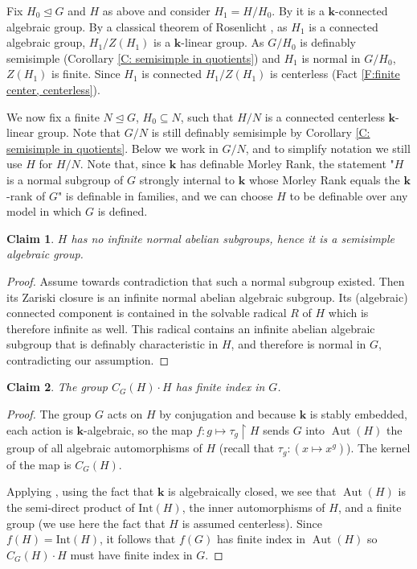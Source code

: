 \documentclass[11pt]{amsart}
\DeclareMathOperator{\aut}{Aut} \DeclareMathOperator{\id}{Id}
\newtheorem{claim}{Claim}[theorem]
\theoremstyle{definition}
\newcommand{\bk}{\textbf{k}}
\newcommand{\0}{\emptyset}
\def\sub{\subseteq}
\begin{document}
Fix $H_0\trianglelefteq G$ and $H$ as above and consider $H_1=H/H_0$. By \cite[Theorem 1]{BousHrWeil} it is a $\bk$-connected algebraic group.  
By a classical theorem of Rosenlicht \cite[Theorem 13]{rosenlicht}, as  $H_1$ is a connected algebraic group,   $H_1/Z(H_1)$ is a $\bk$-linear group. As $G/H_0$ is definably semisimple (Corollary \ref{C: semisimple in quotients})
 and $H_1$ is normal in $G/H_0$, $Z(H_1)$ is finite.  Since $H_1$ is  connected $H_1/Z(H_1)$ is centerless (Fact \ref{F:finite center, centerless}).

We now fix a finite $N\trianglelefteq G$, $H_0\sub N$,  such that 
$H/N$ is a connected centerless $\bk$-linear group. Note that $G/N$ is still definably semisimple by Corollary \ref{C: semisimple in quotients}. Below we work in $G/N$, and to simplify notation we still use $H$ for $H/N$. Note that, since $\bk$ has definable Morley Rank, the statement "$H$ is a normal subgroup of $G$ strongly internal to $\bk$ whose Morley Rank equals the $\bk$-rank of $G$" is definable in families, and we can choose $H$ to be definable over any model in which $G$ is defined. 

\begin{claim}
    $H$ has no infinite normal abelian subgroups, hence it is a semisimple algebraic group.
\end{claim}
\begin{proof} Assume towards contradiction that such a normal subgroup existed. Then its Zariski closure is an infinite normal abelian  algebraic subgroup. Its (algebraic) connected component 
is contained in the solvable radical $R$ of $H$ which is therefore infinite as well. This radical contains an infinite abelian algebraic subgroup that is definably characteristic in $H$, and therefore is normal in $G$, contradicting our assumption. 
\end{proof}

\begin{claim} 
The group $C_G(H)\cdot H$ has finite index in $G$.
\end{claim} 
\begin{proof}
The group $G$ acts on $H$ by conjugation and because $\bk$ is stably embedded, each action is $\bk$-algebraic, so the map $f:g\mapsto \tau_g\restriction H$ sends $G$ into $\aut(H)$ the group of all algebraic automorphisms of $H$ (recall that $\tau_g: (x\mapsto x^g)$).
The kernel of the map is $C_G(H)$.


Applying \cite[Theorem 27.4]{Humph}, using the fact that $\bk$ is algebraically closed, we see that $\aut(H)$ is the semi-direct product of $\mathrm{Int}(H)$, the inner automorphisms of $H$,  and a finite group (we use here the fact that $H$ is assumed centerless). Since $f(H)=\mathrm{Int}(H)$, it follows that $f(G)$ has finite index in $\aut(H)$ so $C_G(H)\cdot H$ must have finite index in $G$.
\end{proof}
\end{document}
